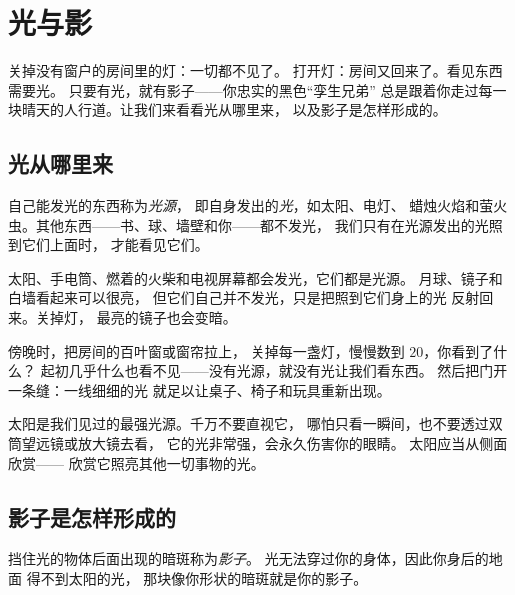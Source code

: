 \chapter{光与影}\label{ch:g1:light-and-shadows}

关掉没有窗户的房间里的灯：一切都不见了。
打开灯：房间又回来了。看见东西需要光。
只要有光，就有影子——你忠实的黑色“孪生兄弟”
总是跟着你走过每一块晴天的人行道。让我们来看看光从哪里来，
以及影子是怎样形成的。

\section{光从哪里来}

\begin{definition}[光源]\label{def:g1:light-and-shadows:source}
自己能发光的东西称为\emph{光源}，
即自身发出的\emph{光}，如太阳、电灯、
蜡烛火焰和萤火虫。其他东西——书、球、墙壁和你——都不发光，
我们只有在光源发出的光照到它们上面时，
才能看见它们。
\end{definition}

\begin{example}[是不是光源？]\label{ex:g1:light-and-shadows:sources}
太阳、手电筒、燃着的火柴和电视屏幕都会发光，它们都是光源。
月球、镜子和白墙看起来可以很亮，
但它们自己并不发光，只是把照到它们身上的光
反射回来。关掉灯，
最亮的镜子也会变暗。
\end{example}

\begin{example}\label{ex:g1:light-and-shadows:darkroom}
傍晚时，把房间的百叶窗或窗帘拉上，
关掉每一盏灯，慢慢数到 $20$，你看到了什么？
起初几乎什么也看不见——没有光源，就没有光让我们看东西。
然后把门开一条缝：一线细细的光
就足以让桌子、椅子和玩具重新出现。
\end{example}

\begin{remark}[永远不要直视太阳]\label{rem:g1:light-and-shadows:sun}
太阳是我们见过的最强光源。千万不要直视它，
哪怕只看一瞬间，也不要透过双筒望远镜或放大镜去看，
它的光非常强，会永久伤害你的眼睛。
太阳应当从侧面欣赏——
欣赏它照亮其他一切事物的光。
\end{remark}

\section{影子是怎样形成的}

\begin{definition}[影子]\label{def:g1:light-and-shadows:shadow}
挡住光的物体后面出现的暗斑称为\emph{影子}。
光无法穿过你的身体，因此你身后的地面
得不到太阳的光，
那块像你形状的暗斑就是你的影子。
\end{definition}

